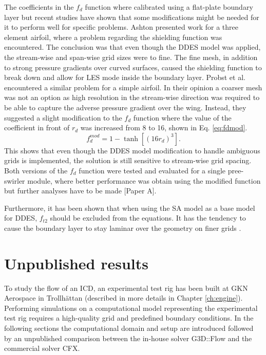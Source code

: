 The coefficients in the $f_d$ function where calibrated using a flat-plate boundary layer but recent studies have shown that some modifications might be needed for it to perform well for specific problems. Ashton \cite{Ashton2016} presented work for a three element airfoil, where a problem regarding the shielding function was encountered. The conclusion was that even though the DDES model was applied, the stream-wise and span-wise grid sizes were to fine. The fine mesh, in addition to strong pressure gradients over curved surfaces, caused the shielding function to break down and allow for LES mode inside the boundary layer. Probst et al. \cite{Probst2010} encountered a similar problem for a simple airfoil. In their opinion a coarser mesh was not an option as high resolution in the stream-wise direction was required to be able to capture the adverse pressure gradient over the wing. Instead, they suggested a slight modification to the $f_d$ function where the value of the coefficient in front of $r_d$ was increased from 8 to 16, shown in Eq. \ref{eq:fdmod}. 
\begin{equation}
  f_d^{mod} = 1-\tanh\left[(16r_d)^3\right].
  \label{eq:fdmod}
\end{equation}
This shows that even though the DDES model modification to handle ambiguous grids is implemented, the solution is still sensitive to stream-wise grid spacing. Both versions of the $f_d$ function were tested and evaluated for a single pree-swirler module, where better performance was obtain using the modified function but further analyses have to be made [Paper A].

Furthermore, it has been shown that when using the SA model as a base model for DDES, $f_{t2}$ should be excluded from the equations. It has the tendency to cause the boundary layer to stay laminar over the geometry on finer grids \cite{Vatsa2017}.



%
\chapter{Unpublished results\label{ch:sim}}%
To study the flow of an ICD, an experimental test rig has been built at GKN Aerospace in Trollhättan (described in more details in Chapter \ref{ch:engine}). Performing simulations on a computational model representing the experimental test rig requires a high-quality grid and predefined boundary conditions. In the following sections the computational domain and setup are introduced followed by an unpublished comparison between the in-house solver G3D::Flow and the commercial solver CFX.
